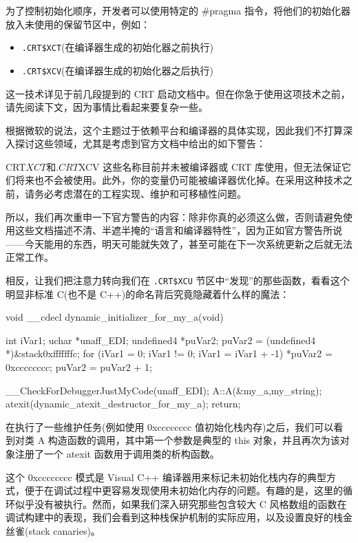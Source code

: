 为了控制初始化顺序，开发者可以使用特定的 \#pragma 指令，将他们的初始化器放入未使用的保留节区中，例如：

\begin{itemize}
\item 
\verb|.CRT$XCT|(在编译器生成的初始化器之前执行)

\item 
\verb|.CRT$XCV|(在编译器生成的初始化器之后执行)
\end{itemize}

这一技术详见于前几段提到的 CRT 启动文档中。但在你急于使用这项技术之前，请先阅读下文，因为事情比看起来要复杂一些。

根据微软的说法，这个主题过于依赖平台和编译器的具体实现，因此我们不打算深入探讨这些领域，尤其是考虑到官方文档中给出的如下警告：

\begin{shell}
CRT$XCT和.CRT$XCV 这些名称目前并未被编译器或 CRT 库使用，但无法保证它们将来也不会被使用。此外，你的变量仍可能被编译器优化掉。在采用这种技术之前，请务必考虑潜在的工程实现、维护和可移植性问题。
\end{shell}

所以，我们再次重申一下官方警告的内容：除非你真的必须这么做，否则请避免使用这些文档描述不清、半遮半掩的“语言和编译器特性”，因为正如官方警告所说——今天能用的东西，明天可能就失效了，甚至可能在下一次系统更新之后就无法正常工作。

相反，让我们把注意力转向我们在 \verb|.CRT$XCU| 节区中“发现”的那些函数，看看这个明显非标准 C(也不是 C++)的命名背后究竟隐藏着什么样的魔法：

\begin{cpp}
void __cdecl dynamic_initializer_for_my_a(void)
{
  int iVar1;
  uchar *unaff_EDI;
  undefined4 *puVar2;
  puVar2 = (undefined4 *)&stack0xfffffffc;
  for (iVar1 = 0; iVar1 != 0; iVar1 = iVar1 + -1) {
  *puVar2 = 0xcccccccc;
  puVar2 = puVar2 + 1;
}

__CheckForDebuggerJustMyCode(unaff_EDI);
  A::A(&my_a,my_string);
  atexit(dynamic_atexit_destructor_for_my_a);
  return;
}
\end{cpp}

在执行了一些维护任务(例如使用 0xcccccccc 值初始化栈内存)之后，我们可以看到对类 A 构造函数的调用，其中第一个参数是典型的 this 对象，并且再次为该对象注册了一个 atexit 函数用于调用类的析构函数。

这个 0xcccccccc 模式是 Visual C++ 编译器用来标记未初始化栈内存的典型方式，便于在调试过程中更容易发现使用未初始化内存的问题。有趣的是，这里的循环似乎没有被执行。然而，如果我们深入研究那些包含较大 C 风格数组的函数在调试构建中的表现，我们会看到这种栈保护机制的实际应用，以及设置良好的栈金丝雀(stack canaries)。

